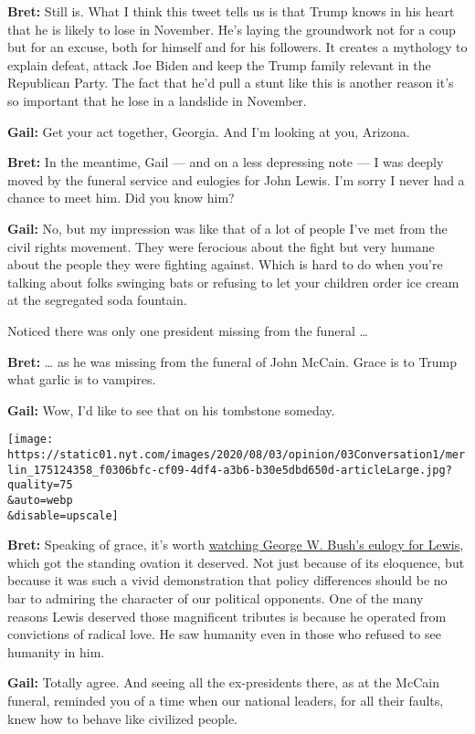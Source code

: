 \textbf{Bret:} Still is. What I think this tweet tells us is that Trump
knows in his heart that he is likely to lose in November. He's laying
the groundwork not for a coup but for an excuse, both for himself and
for his followers. It creates a mythology to explain defeat, attack Joe
Biden and keep the Trump family relevant in the Republican Party. The
fact that he'd pull a stunt like this is another reason it's so
important that he lose in a landslide in November.

\textbf{Gail:} Get your act together, Georgia. And I'm looking at you,
Arizona.

\textbf{Bret:} In the meantime, Gail --- and on a less depressing note
--- I was deeply moved by the funeral service and eulogies for John
Lewis. I'm sorry I never had a chance to meet him. Did you know him?

\textbf{Gail:} No, but my impression was like that of a lot of people
I've met from the civil rights movement. They were ferocious about the
fight but very humane about the people they were fighting against. Which
is hard to do when you're talking about folks swinging bats or refusing
to let your children order ice cream at the segregated soda fountain.

Noticed there was only one president missing from the funeral \ldots{}

\textbf{Bret:} \ldots{} as he was missing from the funeral of John
McCain. Grace is to Trump what garlic is to vampires.

\textbf{Gail:} Wow, I'd like to see that on his tombstone someday.

\texttt{[image: https://static01.nyt.com/images/2020/08/03/opinion/03Conversation1/merlin\_175124358\_f0306bfc-cf09-4df4-a3b6-b30e5dbd650d-articleLarge.jpg?quality=75\\\&auto=webp\\\&disable=upscale]}

\textbf{Bret:} Speaking of grace, it's worth
\href{https://www.youtube.com/watch?v=Rwvvt_mzV_Q}{watching George W.
Bush's eulogy for Lewis}, which got the standing ovation it deserved.
Not just because of its eloquence, but because it was such a vivid
demonstration that policy differences should be no bar to admiring the
character of our political opponents. One of the many reasons Lewis
deserved those magnificent tributes is because he operated from
convictions of radical love. He saw humanity even in those who refused
to see humanity in him.

\textbf{Gail:} Totally agree. And seeing all the ex-presidents there, as
at the McCain funeral, reminded you of a time when our national leaders,
for all their faults, knew how to behave like civilized people.

